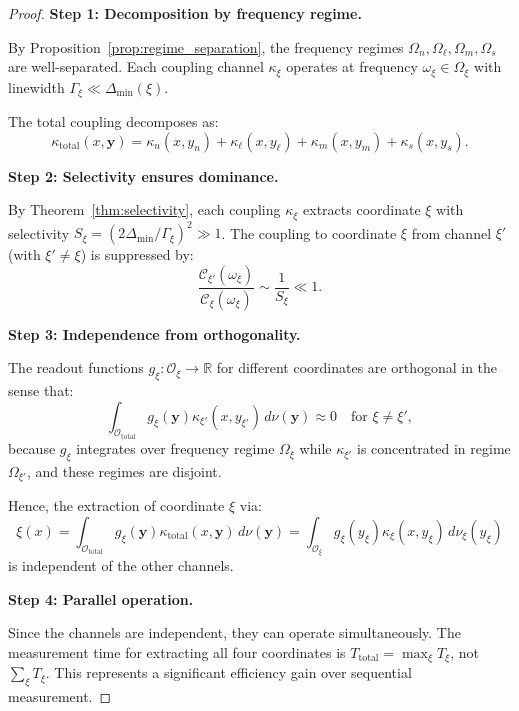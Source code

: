 \documentclass[twocolumn,10pt,a4paper]{article}
\theoremstyle{remark}
\newcommand{\oscillator}{\mathcal{O}}
\newcommand{\Reals}{\mathbb{R}}
\begin{document}
\begin{proof}
\textbf{Step 1: Decomposition by frequency regime.}

By Proposition~\ref{prop:regime_separation}, the frequency regimes $\Omega_n, \Omega_\ell, \Omega_m, \Omega_s$ are well-separated. Each coupling channel $\kappa_\xi$ operates at frequency $\omega_\xi \in \Omega_\xi$ with linewidth $\Gamma_\xi \ll \Delta_{\min}(\xi)$.

The total coupling decomposes as:
\begin{equation}
\kappa_{\text{total}}(x, \mathbf{y}) = \kappa_n(x, y_n) + \kappa_\ell(x, y_\ell) + \kappa_m(x, y_m) + \kappa_s(x, y_s).
\end{equation}

\textbf{Step 2: Selectivity ensures dominance.}

By Theorem~\ref{thm:selectivity}, each coupling $\kappa_\xi$ extracts coordinate $\xi$ with selectivity $S_\xi = (2\Delta_{\min}/\Gamma_\xi)^2 \gg 1$. The coupling to coordinate $\xi$ from channel $\xi'$ (with $\xi' \neq \xi$) is suppressed by:
\begin{equation}
\frac{\mathcal{C}_{\xi'}(\omega_\xi)}{\mathcal{C}_\xi(\omega_\xi)} \sim \frac{1}{S_\xi} \ll 1.
\end{equation}

\textbf{Step 3: Independence from orthogonality.}

The readout functions $g_\xi: \oscillator_\xi \to \Reals$ for different coordinates are orthogonal in the sense that:
\begin{equation}
\int_{\oscillator_{\text{total}}} g_\xi(\mathbf{y}) \kappa_{\xi'}(x, y_{\xi'}) \, d\nu(\mathbf{y}) \approx 0 \quad \text{for } \xi \neq \xi',
\end{equation}
because $g_\xi$ integrates over frequency regime $\Omega_\xi$ while $\kappa_{\xi'}$ is concentrated in regime $\Omega_{\xi'}$, and these regimes are disjoint.

Hence, the extraction of coordinate $\xi$ via:
\begin{equation}
\xi(x) = \int_{\oscillator_{\text{total}}} g_\xi(\mathbf{y}) \kappa_{\text{total}}(x, \mathbf{y}) \, d\nu(\mathbf{y}) = \int_{\oscillator_\xi} g_\xi(y_\xi) \kappa_\xi(x, y_\xi) \, d\nu_\xi(y_\xi)
\end{equation}
is independent of the other channels.

\textbf{Step 4: Parallel operation.}

Since the channels are independent, they can operate simultaneously. The measurement time for extracting all four coordinates is $T_{\text{total}} = \max_\xi T_\xi$, not $\sum_\xi T_\xi$. This represents a significant efficiency gain over sequential measurement.
\end{proof}
\end{document}
